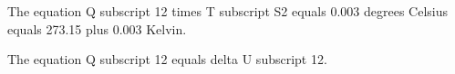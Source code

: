 The equation Q subscript 12 times T subscript S2 equals 0.003 degrees Celsius equals 273.15 plus 0.003 Kelvin.

The equation Q subscript 12 equals delta U subscript 12.